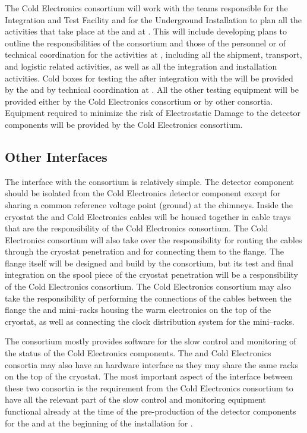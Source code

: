 The Cold Electronics consortium will work with the teams responsible
for the Integration and Test Facility and for the Underground Installation
to plan all the activities that take place at the  and at
\surf. This will include developing plans to outline the responsibilities
of the consortium and those of the  personnel or of 
technical coordination for the activities at \surf, including all the
shipment, transport, and logistic related activities, as well as all
the integration and installation activities. Cold boxes for testing
the  after integration with the  will be 
provided by the  and by technical coordination at \surf.
All the other testing equipment will be provided either by the Cold
Electronics consortium or by other consortia. Equipment required to
minimize the risk of Electrostatic Damage to the detector components
will  be provided by the Cold Electronics consortium. 

\subsection{Other Interfaces}
\label{sec:fdsp-tpcelec-interfaces-other}

The interface with the  consortium is relatively simple.
The  detector component should be isolated from the Cold
Electronics detector component except for sharing a common reference 
voltage point (ground) at the chimneys. Inside the cryostat the 
 and Cold Electronics cables will be housed together in
cable trays that are the responsibility of the Cold  Electronics
consortium. The Cold  Electronics consortium will also take over
the responsibility for routing the  cables through the
cryostat penetration and for connecting them to the 
flange. The flange itself will be designed and build by the 
consortium, but its test and final integration on the spool piece
of the cryostat penetration will be a responsibility of the Cold
Electronics consortium. The Cold Electronics consortium may also
take the responsibility of performing the connections of the 
 cables between the flange the and mini--racks housing
the  warm electronics on the top of the cryostat, as
well as connecting the clock distribution system for the mini--racks.

The  consortium mostly provides software for the slow
control and monitoring of the status of the Cold Electronics components.
The  and Cold Electronics consortia may also have an
hardware interface as they may share the same racks on the top of the
cryostat. The most important aspect of the interface between these
two consortia is the requirement from the Cold Electronics consortium
to have all the relevant part of the slow control and monitoring
equipment functional already at the time of the pre-production of
the detector components for the  and at the beginning
of the installation for \surf.
